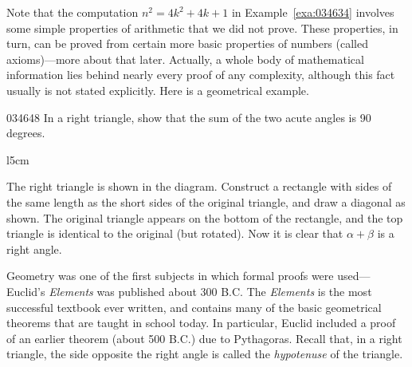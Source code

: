 Note that the computation $n^{2} = 4k^{2} + 4k + 1$ in Example~\ref{exa:034634}
 involves some simple properties of arithmetic that we did not prove. 
These properties, in turn, can be proved from certain more basic 
properties of numbers (called axioms)---more about that later. Actually, a
 whole body of mathematical information lies behind nearly every proof 
of any complexity, although this fact usually is not stated explicitly. 
Here is a geometrical example.


\newpage
\begin{example}{}{034648}
In a right triangle, show that the sum of the two acute angles is 90 degrees.


\begin{solution}
\begin{wrapfigure}{l}{5cm} 
\centering

\end{wrapfigure}

\setlength{\rightskip}{0pt plus 200pt}
 The right triangle is shown in the diagram. Construct a rectangle with 
sides of the same length as the short sides of the original triangle, 
and draw a diagonal as shown. The original triangle appears on the 
bottom of the rectangle, and the top triangle is identical to the 
original (but rotated). Now it is clear that $\alpha + \beta$ is a right angle.
\vspace{5em}
\end{solution}
\end{example}

Geometry was one of the first subjects in which formal proofs were used---Euclid's \textit{Elements} was published about 300 B.C. The \textit{Elements}
 is the most successful textbook ever written, and contains many of the 
basic geometrical theorems that are taught in school today. In 
particular, Euclid included a proof of an earlier theorem (about 500 
B.C.) due to Pythagoras. Recall that, in a right triangle, the side 
opposite the right angle is called the \textit{hypotenuse} of the triangle.


